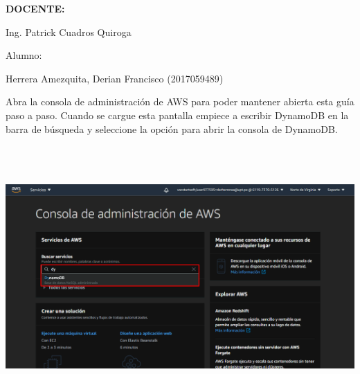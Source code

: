 \documentclass[12pt,letterpaper]{article}
\begin{document}
\begin{titlepage}
\begin{center}
\vspace*{0.3in}
\begin{Large}
\textbf{DOCENTE:} \\
\end{Large}

\vspace*{0.1in}
\begin{large}
Ing. Patrick Cuadros Quiroga\\
\end{large}

\vspace*{0.2in}
\vspace*{0.1in}
\begin{large}
Alumno: \\
\begin{flushleft}
 Herrera Amezquita, Derian Francisco		\hfill	(2017059489) \\


\end{flushleft}
\end{large}
\end{center}

\end{titlepage}



\tableofcontents %
\thispagestyle{empty} %
\newpage
\setcounter{page}{1} %


Abra la consola de administración de AWS para poder mantener abierta esta guía paso a paso. Cuando se cargue esta pantalla empiece a escribir DynamoDB en la barra de búsqueda y seleccione la opción para abrir la consola de DynamoDB.

\begin{center}
    \includegraphics[width=18cm, height=10cm]{img/1.png}  
\end{center}
\newpage
\end{document}

